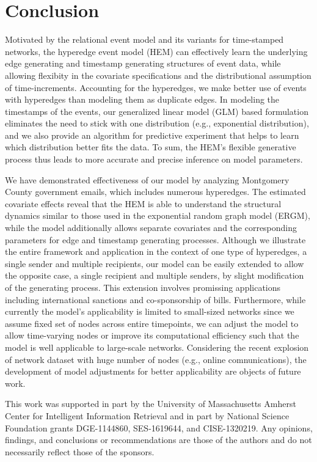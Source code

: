 \documentclass[ba]{imsart}
\numberwithin{equation}{section}
\theoremstyle{plain}
\begin{document}
\section{Conclusion}\label{sec:conclusion}
Motivated by the relational event model \citep{Butts2008} and its variants for time-stamped networks, the hyperedge event model (HEM) can effectively learn the underlying edge generating and timestamp generating structures of event data, while allowing flexibity in the covariate specifications and the distributional assumption of time-increments.
Accounting for the hyperedges, we make better use of events with hyperedges than modeling them as duplicate edges. In modeling the timestamps of the events, our generalized linear model (GLM) based formulation eliminates the need to stick with one distribution (e.g., exponential distribution), and we also provide an algorithm for predictive experiment that helps to learn which distribution better fits the data. To sum, the HEM's flexible generative process thus leads to more accurate and precise inference on model parameters.

We have demonstrated effectiveness of our model by analyzing Montgomery County government emails, which includes numerous hyperedges. The estimated covariate effects reveal that the HEM is able to understand the structural dynamics similar to those used in the exponential random graph model (ERGM), while the model additionally allows separate covariates and the corresponding parameters for edge and timestamp generating processes. Although we illustrate the entire framework and application in the context
of one type of hyperedges, a single sender and multiple recipients, our model can be easily extended to allow the opposite case, a single recipient and multiple senders, by slight modification of the generating process. This extension involves promissing applications including international sanctions and co-sponsorship of bills. Furthermore, while currently the model's applicability is limited to small-sized networks since we assume fixed set of nodes across entire timepoints, we can adjust the model to allow time-varying nodes or improve its computational efficiency such that the model is well applicable to large-scale networks. Considering the recent explosion of network dataset with huge number of nodes (e.g., online comnunications), the development of model adjustments for better applicability are objects of future work.

\begin{acknowledgement}
	This work was supported in part by the University of Massachusetts Amherst Center for Intelligent Information Retrieval and in part by National Science Foundation grants DGE-1144860, SES-1619644, and CISE-1320219. Any opinions, findings, and conclusions or recommendations are those of the authors and do not necessarily reflect those of the
	sponsors.
\end{acknowledgement}
\end{document}

